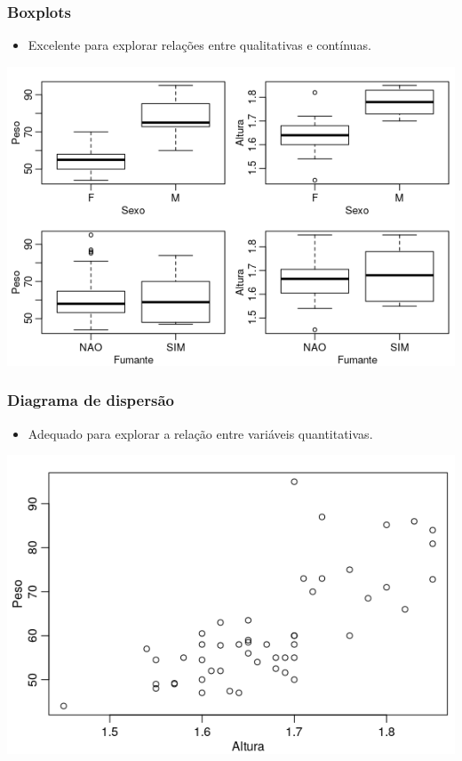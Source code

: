 \documentclass[11pt]{beamer}
\begin{document}
\begin{frame}
\frametitle{Boxplots}

\begin{itemize}
\item
  Excelente para explorar relações entre qualitativas e contínuas.
\end{itemize}

\begin{center}\includegraphics[width=0.7\linewidth]{figs/bx.png} \end{center}
\end{frame}

\begin{frame}
\frametitle{Diagrama de dispersão}

\begin{itemize}
\item
  Adequado para explorar a relação entre variáveis quantitativas.
\end{itemize}

\begin{center}\includegraphics[width=0.8\linewidth]{figs/dispersao} \end{center}
\end{frame}
\end{document}
